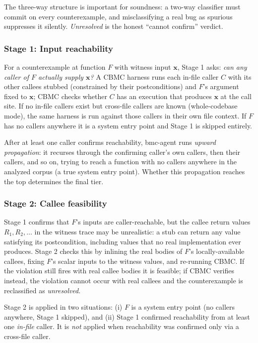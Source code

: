 \documentclass[11pt,a4paper]{article}
\newcommand{\tool}{bmc-agent\xspace}
\begin{document}
The three-way structure is important for soundness: a two-way classifier must
commit on every counterexample, and misclassifying a real bug as spurious
suppresses it silently. \emph{Unresolved} is the honest ``cannot confirm''
verdict.

\subsubsection{Stage 1: Input reachability}

For a counterexample at function $F$ with witness input $\mathbf{x}$, Stage 1
asks: \emph{can any caller of $F$ actually supply $\mathbf{x}$?}
A CBMC harness runs each in-file caller $C$ with its other callees stubbed
(constrained by their postconditions) and $F$'s argument fixed to
$\mathbf{x}$; CBMC checks whether $C$ has an execution that produces
$\mathbf{x}$ at the call site. If no in-file callers exist but cross-file
callers are known (whole-codebase mode), the same harness is run against
those callers in their own file context. If $F$ has no callers anywhere it is
a system entry point and Stage 1 is skipped entirely.

After at least one caller confirms reachability, \tool runs
\emph{upward propagation}: it recurses through the confirming caller's own
callers, then their callers, and so on, trying to reach a function with no
callers anywhere in the analyzed corpus (a true system entry point). Whether
this propagation reaches the top determines the final tier.

\subsubsection{Stage 2: Callee feasibility}

Stage 1 confirms that $F$'s inputs are caller-reachable, but the callee
return values $R_1, R_2, \ldots$ in the witness trace may be unrealistic:
a stub can return any value satisfying its postcondition, including values
that no real implementation ever produces. Stage 2 checks this by inlining
the real bodies of $F$'s locally-available callees, fixing $F$'s scalar
inputs to the witness values, and re-running CBMC. If the violation still
fires with real callee bodies it is feasible; if CBMC verifies instead, the
violation cannot occur with real callees and the counterexample is
reclassified as \emph{unresolved}.

Stage 2 is applied in two situations: (i) $F$ is a system entry point (no
callers anywhere, Stage 1 skipped), and (ii) Stage 1 confirmed reachability
from at least one \emph{in-file} caller. It is \emph{not} applied when
reachability was confirmed only via a cross-file caller.
\end{document}
